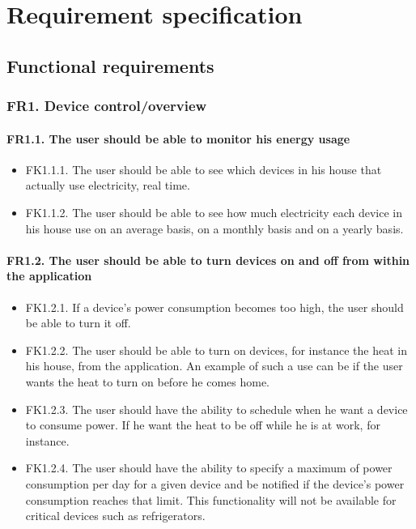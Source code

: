 \chapter{Requirement specification}
\section{Functional requirements}


\subsection{FR1. Device control/overview}
\subsubsection{FR1.1. The user should be able to monitor his energy usage}

\begin{itemize}
\item FK1.1.1. The user should be able to see which devices in his house that actually use electricity, real time.
\item FK1.1.2. The user should be able to see how much electricity each device in his house use on an average basis, on a monthly basis and on a yearly basis.
\end{itemize}

\subsubsection{FR1.2. The user should be able to turn devices on and off from within the application}
\begin{itemize}
\item FK1.2.1. If a device's power consumption becomes too high, the user should be able to turn it off.
\item FK1.2.2. The user should be able to turn on devices, for instance the heat in his house, from the application. An example of such a use can be if the user wants the heat to turn on before he comes home.
\item FK1.2.3. The user should have the ability to schedule when he want a device to consume power. If he want the heat to be off while he is at work, for instance. 
\item FK1.2.4. The user should have the ability to specify a maximum of power 
consumption per day for a given device and be notified if the device's power
consumption reaches that limit. This functionality will not be available
for critical devices such as refrigerators. 
\end{itemize}

